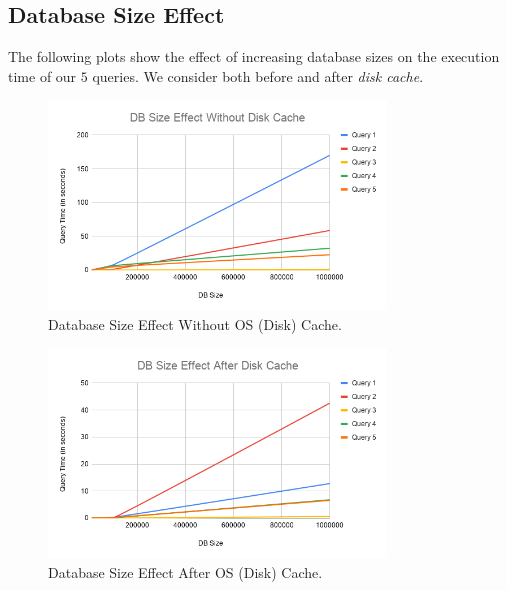 \subsection{Database Size Effect}
The following plots show the effect of increasing database sizes on the execution time of our $5$ queries. We consider both before and after \emph{disk cache}.

\begin{figure}[H]
    \centering
    \includegraphics[width=0.8\textwidth]{images/db-size-without-cache.png}
    \caption{Database Size Effect Without OS (Disk) Cache.}
    \label{fig:db-size-1}
\end{figure}

\begin{figure}[H]
    \centering
    \includegraphics[width=0.8\textwidth]{images/db-size-after-cache .png}
    \caption{Database Size Effect After OS (Disk) Cache.}
    \label{fig:db-size-2}
\end{figure}

